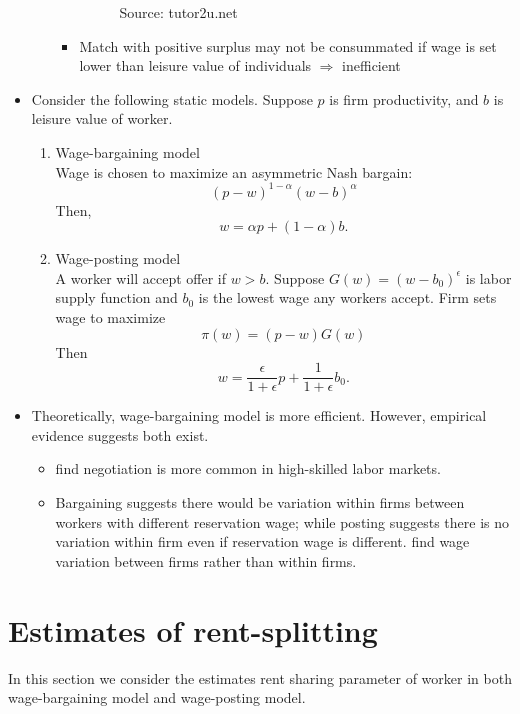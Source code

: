 \documentclass[a4paper, 12pt]{article}
\newcommand\fnote[1]{\captionsetup{font=small}\caption*{ #1}}
\begin{document}
\begin{itemize}
\begin{enumerate}
\begin{itemize}
\begin{figure}[h]
\fnote {Source: tutor2u.net}
\end{figure}
\item Match with positive surplus may not be consummated if wage is set lower than leisure value of individuals $\Rightarrow$ inefficient
\end{itemize}
\end{enumerate}
\item Consider the following static models. Suppose $p$ is firm productivity, and $b$ is leisure value of worker.
\begin{enumerate}
\item Wage-bargaining model \\
Wage is chosen to maximize an asymmetric Nash bargain:
\begin{equation}
(p-w)^{1-\alpha}(w-b)^\alpha
\end{equation}
Then, 
\begin{equation}
w = \alpha p + (1-\alpha)b.
\end{equation}
\item Wage-posting model \\
A worker will accept offer if $w>b$. Suppose $G(w) = (w-b_0)^\epsilon$ is labor supply function and $b_0$ is the lowest wage any workers accept. Firm sets wage to maximize
\begin{equation}
\pi(w) = (p-w)G(w)
\end{equation}
Then
\begin{equation}
w = 
\frac{\epsilon}{1+\epsilon}p
+
\frac{1}{1+\epsilon}b_0.
\end{equation}
\end{enumerate}
\item Theoretically, wage-bargaining model is more efficient. However, empirical evidence suggests both exist.
\begin{itemize}
\item \cite{hall2008wage} find negotiation is more common in high-skilled labor markets.
\item  Bargaining suggests there would be variation within firms between workers with different reservation wage; while posting suggests there is no variation within firm even if reservation wage is different. \cite{machin2004test} find wage variation between firms rather than within firms.
\end{itemize}
\end{itemize}
\section{Estimates of rent-splitting}
In this section we consider the estimates rent sharing parameter of worker in both wage-bargaining model and wage-posting model.
\end{document}
